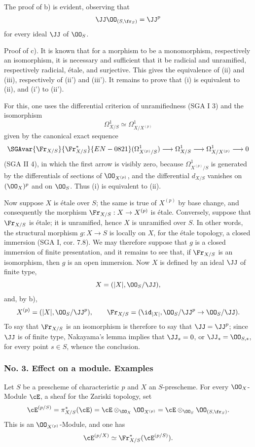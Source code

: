 The proof of b) is evident, observing that
\[
\JJ\OO_{(S,\fr_S)}=\JJ^p
\]
for every ideal $\JJ$ of $\OO_S$.

Proof of c). It is known that for a morphism to be a monomorphism, respectively an isomorphism, it is necessary and sufficient that it be radicial and unramified, respectively radicial, étale, and surjective. This gives the equivalence of (ii) and (iii), respectively of (ii') and (iii'). It remains to prove that (i) is equivalent to (ii), and (i') to (ii').

For this, one uses the differential criterion of unramifiedness (SGA I 3) and the isomorphism
\[
\Omega^1_{X/S}\simeq \Omega^1_{X/X^{(p)}}
\]
given by the canonical exact sequence
\[
\SGAvar{\Fr_{X/S}}{\Fr_{X/S}^*}{EN-0821}(\Omega^1_{X^{(p)}/S})\longrightarrow \Omega^1_{X/S}
\longrightarrow \Omega^1_{X/X^{(p)}}\longrightarrow 0
\]
(SGA II 4), in which the first arrow is visibly zero, because $\Omega^1_{X^{(p)}/S}$ is generated by the differentials of sections of $\OO_{X^{(p)}}$, and the differential $d_{X/S}$ vanishes on $(\OO_X)^p$ and on $\OO_S$. Thus (i) is equivalent to (ii).

Now suppose $X$ is étale over $S$; the same is true of $X^{(p)}$ by base change, and consequently the morphism $\Fr_{X/S}:X\to X^{(p)}$ is étale. Conversely, suppose that $\Fr_{X/S}$ is étale; it is unramified, hence $X$ is unramified over $S$. In other words, the structural morphism $g:X\to S$ is locally on $X$, for the étale topology, a closed immersion (SGA I, cor. 7.8). We may therefore suppose that $g$ is a closed immersion of finite presentation, and it remains to see that, if $\Fr_{X/S}$ is an isomorphism, then $g$ is an open immersion. Now $X$ is defined by an ideal $\JJ$ of finite type,
\[
X=(|X|,\OO_S/\JJ),
\]
and, by b),
\[
X^{(p)}=(|X|,\OO_S/\JJ^p),
\qquad
\Fr_{X/S}=(\id_{|X|},\OO_S/\JJ^p\to\OO_S/\JJ).
\]
To say that $\Fr_{X/S}$ is an isomorphism is therefore to say that $\JJ=\JJ^p$; since $\JJ$ is of finite type, Nakayama's lemma implies that $\JJ_s=0$, or $\JJ_s=\OO_{S,s}$, for every point $s\in S$, whence the conclusion.

\subsubsection*{No. 3. Effect on a module. Examples}

Let $S$ be a prescheme of characteristic $p$ and $X$ an $S$-prescheme. For every $\OO_X$-Module $\cE$, a sheaf for the Zariski topology, set
\[
\cE^{(p/S)}=\pi_{X/S}^*(\cE)=\cE\otimes_{\OO_X}\OO_{X^{(p)}}
 =\cE\otimes_{\OO_S}\OO_{(S,\fr_S)}.
\]
This is an $\OO_{X^{(p)}}$-Module, and one has
\[
\cE^{(p/X)}\simeq \Fr_{X/S}^*(\cE^{(p/S)}).
\]

